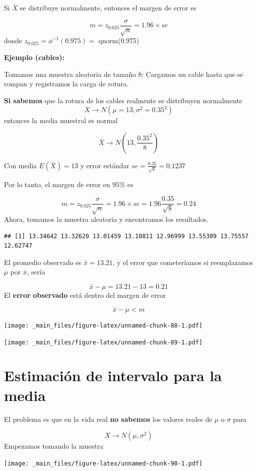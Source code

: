 \documentclass[
]{book}
\begin{document}
Si \(\bar{X}\) se distribuye normalmente, entonces el margen de error es

\[m=z_{0.025} \frac{\sigma}{\sqrt{n}}=1.96\times se\]
donde \(z_{0.025}=\phi^{-1}(0.975)=\) qnorm(0.975)

\textbf{Ejemplo (cables):}

Tomamos una muestra aleatoria de tamaño \(8\): Cargamos un cable hasta que se rompan y registramos la carga de rotura.

\textbf{Si sabemos} que la rotura de los cables realmente se distribuyen normalmente \[X \rightarrow N(\mu=13, \sigma^2=0.35^2)\] entonces la media muestral es normal

\[\bar{X} \rightarrow N(13, \frac{0.35^2}{8})\]

Con media \(E(\bar{X})=13\) y error estándar \(se=\frac{0.35}{\sqrt{8}}=0.1237\)

Por lo tanto, el margen de error en \(95\%\) es

\[m=z_{0.025} \frac{\sigma}{\sqrt{n}}=1.96\times se=1.96\frac{0.35}{\sqrt{8}}=0.24\]
Ahora, tomamos la muestra aleatoria y encontramos los resultados.

\begin{verbatim}
## [1] 13.34642 13.32620 13.01459 13.10811 12.96999 13.55309 13.75557 12.62747
\end{verbatim}

El promedio observado es \(\bar{x}=13.21\), y el error que cometeríamos si reemplazamos \(\mu\) por \(\bar{x}\), sería

\[\bar{x}-\mu=13.21-13=0.21\]
El \textbf{error observado} está dentro del margen de error

\[\bar{x}-\mu <m\]

\texttt{[image: \_main\_files/figure-latex/unnamed-chunk-88-1.pdf]}

\texttt{[image: \_main\_files/figure-latex/unnamed-chunk-89-1.pdf]}

\hypertarget{estimaciuxf3n-de-intervalo-para-la-media}{%
\section{Estimación de intervalo para la media}\label{estimaciuxf3n-de-intervalo-para-la-media}}

El problema es que en la vida real \textbf{no sabemos} los valores reales de \(\mu\) o \(\sigma\) para

\[X \rightarrow N(\mu, \sigma^2)\]
Empezamos tomando la muestra

\texttt{[image: \_main\_files/figure-latex/unnamed-chunk-90-1.pdf]}
\end{document}
